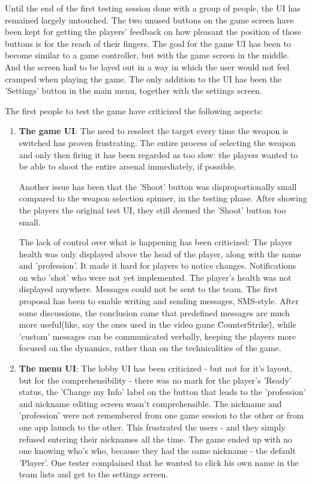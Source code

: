 Until the end of the first testing session done with a group of people, the UI
has remained largely untouched. The two unused buttons on the game screen have
been kept for getting the players' feedback on how pleasant the position of
those buttons is for the reach of their fingers. The goal for the game UI has
been to become similar to a game controller, but with the game screen in the
middle. And the screen had to be layed out in a way in which the user would not
feel cramped when playing the game. The only addition to the UI has been
the 'Settings' button in the main menu, together with the settings
screen.\newline

The first people to test the game have criticized the following aspects:
\begin{enumerate}
  \item \textbf{The game UI}: The need to reselect the target every time the
  weapon is switched has proven frustrating. The entire process of selecting the
  weapon and only then firing it has been regarded as too slow: the players
  wanted to be able to shoot the entire arsenal immediately, if
  possible.\newline
  
  Another issue has been that the 'Shoot' button was disproportionally small
  compared to the weapon selection spinner, in the testing phase. After showing
  the players the original test UI, they still deemed the 'Shoot' button too
  small.\newline
  
  The lack of control over what is happening has been criticized: The player
  health was only displayed above the head of the player, along with the name
  and 'profession'. It made it hard for players to notice changes. Notifications
  on who 'shot' who were not yet implemented. The player's health was not
  displayed anywhere. Messages could not be sent to the team. The first proposal
  has been to enable writing and sending messages, SMS-style. After some
  discussions, the conclusion came that predefined messages are much more
  useful(like, say the ones used in the video game \"CounterStrike\"), while
  'custom' messages can be communicated verbally, keeping the players more
  focused on the dynamics, rather than on the technicalities of the game.
  
  \item \textbf{The menu UI}: The lobby UI has been criticized - but not for
  it's layout, but for the comprehensibility - there was no mark for the
  player's 'Ready' status, the 'Change my Info' label on the button that leads
  to the 'profession' and nickname editing screen wasn't comprehensible. The
  nickname and 'profession' were not remembered from one game session to the
  other or from one app launch to the other. This frustrated the users - and
  they simply refused entering their nicknames all the time. The game ended up
  with no one knowing who's who, because they had the same nickname - the
  default 'Player'. One tester complained that he wanted to click his own name
  in the team lists and get to the settings screen.\newline
  

\end{enumerate}
